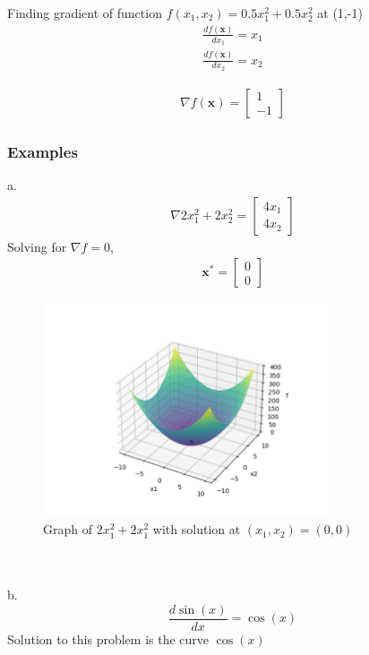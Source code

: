 Finding gradient of function $f(x_1, x_2) = 0.5x_1^2 + 0.5x_2^2$ at (1,-1)
\begin{gather}
  \frac{d f(\textbf{x})}{d x_1} = x_1 \\
  \frac{d f(\textbf{x})}{d x_2} = x_2
\end{gather}

\begin{align}
  \nabla f(\textbf{x}) = 
  \begin{bmatrix}
    1 \\
    -1
  \end{bmatrix}
\end{align}

\subsubsection{Examples}
a. 
\begin{align}
  \nabla 2 x_1^2 + 2 x_2^2 = 
  \begin{bmatrix}
     4x_1 \\
     4x_2
  \end{bmatrix}
\end{align}
Solving for $\nabla f = 0$,
\begin{align} 
  \textbf{x}^* = 
  \begin{bmatrix}
    0 \\
    0
  \end{bmatrix}
\end{align}
\begin{figure}[htbp]
  \centerline{\includegraphics[width=0.75\textwidth]{images/gradient_ex1.png}}
  \caption{Graph of $2 x_1^2 + 2 x_1^2$ with solution at $(x_1,x_2) = (0,0)$}
  \label{fig:gradient_ex1}
\end{figure}
\\ \\ 
b. 
\begin{equation}
  \frac{d \sin(x)}{d x} = \cos(x) 
\end{equation}
Solution to this problem is the curve $\cos(x)$

